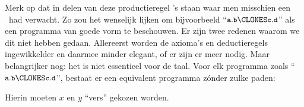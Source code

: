 %
Merk op dat in delen van deze productieregel \Id's staan waar men misschien een \Path\ had verwacht. Zo zou het wenselijk lijken om bijvoorbeeld ``$\id{a}.\id{b} \CLONES \id{c}.\id{d}$'' als een programma van goede vorm te beschouwen. Er zijn twee redenen waarom we dit niet hebben gedaan. Allereerst worden de axioma's en deductieregels ingewikkelder en daarmee minder elegant, of er zijn er meer nodig. Maar belangrijker nog: het is niet essentieel voor de taal. Voor elk programma zoals ``$\id{a}.\id{b} \CLONES \id{c}.\id{d}$'', bestaat er een equivalent programma zónder zulke paden:

\begin{minipage}[t]{.5\textwidth}
  \newCodeFragment
\end{minipage}
\begin{minipage}[t]{.5\textwidth}
  \newCodeFragment
\end{minipage}

Hierin moeten $x$ en $y$ ``vers'' gekozen worden.

